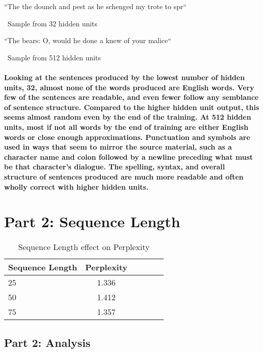 \documentclass[10pt,a4paper]{report}
\begin{document}
``The the dounch and pest as he schenged my trote to spr``

\ 
Sample from 32 hidden units 
\vspace{5mm}

``The bears: O, would he done a knew of your malice``

\ 
Sample from 512 hidden units 
\

\paragraph{
Looking at the sentences produced by the lowest number of hidden units, 32, almost none of the words produced are English words. Very few of the sentences are readable, and even fewer follow any semblance of sentence structure. Compared to the higher hidden unit output, this seems almost random even by the end of the training. At 512 hidden units, most if not all words by the end of training are either English words or close enough approximations. Punctuation and symbols are used in ways that seem to mirror the source material, such as a character name and colon followed by a newline preceding what must be that character's dialogue. The spelling, syntax, and overall structure of sentences produced are much more readable and often wholly correct with higher hidden units.
}

\clearpage

\section{Part 2: Sequence Length}

\begin{table}[h]
 \caption{Sequence Length effect on Perplexity}
 \label{tbl:bTable}
 \begin{center}
  \begin{tabular}{lccrrr}
    \hline 
	Sequence Length & Perplexity\\
	\hline
	25 & 1.336\\
	50 & 1.412\\
	75 & 1.357\\
  \end{tabular}
 \end{center}
\end{table}

\subsection{Part 2: Analysis}
\end{document}
